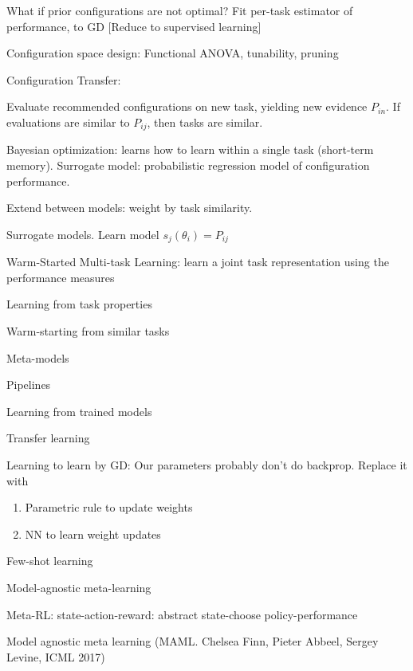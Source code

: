\documentclass[english]{article}
\begin{document}
\item What if prior configurations are not optimal? Fit per-task estimator of performance, to GD [Reduce to supervised learning]

\item Configuration space design: Functional ANOVA, tunability, pruning

\item Configuration Transfer: 

Evaluate recommended configurations on new task, yielding new evidence $P_{in}$. If evaluations are similar to $P_{ij}$, then tasks are similar.

\item Bayesian optimization: learns how to learn within a single task (short-term memory). Surrogate model: probabilistic regression model of configuration performance. 

Extend between models: weight by task similarity. 

\item Surrogate models. Learn model $s_j(\theta_i)=P_{ij}$

\item Warm-Started Multi-task Learning: learn a joint task representation using the performance measures


\eenum

\item Learning from task properties

Warm-starting from similar tasks

Meta-models

Pipelines

\item Learning from trained models 

Transfer learning

Learning to learn by GD: Our parameters probably don't do backprop. Replace it with 
\begin{enumerate}
\item Parametric rule to update weights
\item NN to learn weight updates
\end{enumerate}

Few-shot learning

Model-agnostic meta-learning

Meta-RL: state-action-reward: abstract state-choose policy-performance

\eenum 

\item Model agnostic meta learning (MAML. Chelsea Finn, Pieter Abbeel, Sergey Levine, ICML 2017)
\end{document}
